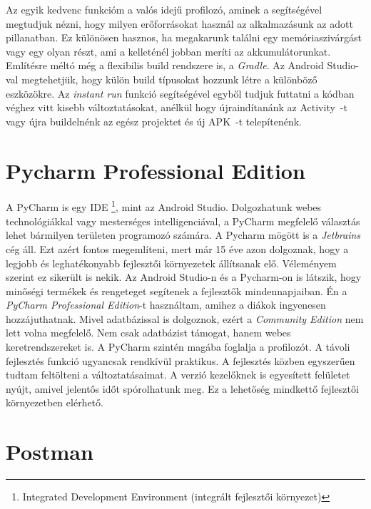 \documentclass{thesis-ekf}
\theoremstyle{definition}
\theoremstyle{remark}
\begin{document}
Az egyik kedvenc funkcióm a valós idejű profilozó, aminek a segítségével megtudjuk nézni, hogy milyen erőforrásokat használ az alkalmazásunk az adott pillanatban.
Ez különösen hasznos, ha megakarunk találni egy memóriaszivárgást vagy egy olyan részt, ami a kelleténél jobban meríti az akkumulátorunkat.
Említésre méltó még a flexibilis build rendszere is, a \emph{Gradle}. 
Az Android Studio-val megtehetjük, hogy külön build típusokat hozzunk létre a különböző eszközökre.
Az \emph{instant run} funkció segítségével egyből tudjuk futtatni a kódban véghez vitt kisebb változtatásokat, anélkül hogy újraindítanánk az Activity~-t vagy újra buildelnénk az egész projektet és új APK~-t telepítenénk.
\cite{androidstudio}

\section{Pycharm Professional Edition}

A PyCharm is egy IDE \footnote{Integrated Development Environment (integrált fejlesztői környezet)}, mint az Android Studio.
Dolgozhatunk webes technológiákkal vagy mesterséges intelligenciával, a PyCharm megfelelő választás lehet bármilyen területen programozó számára.
A Pycharm mögött is a \emph{Jetbrains} cég áll. Ezt azért fontos megemlíteni, mert már 15 éve azon dolgoznak, hogy a legjobb és leghatékonyabb fejlesztői környezetek állítsanak elő.
Véleményem szerint ez sikerült is nekik. Az Android Studio-n és a Pycharm-on  is látszik, hogy minőségi termékek és rengeteget segítenek a fejlesztők mindennapjaiban.
Én a \emph{PyCharm Professional Edition}-t használtam, amihez a diákok ingyenesen hozzájuthatnak.
Mivel adatbázissal is dolgoznok, ezért a \emph{Community Edition} nem lett volna megfelelő.
Nem csak adatbázist támogat, hanem webes keretrendszereket is.
A PyCharm szintén magába foglalja a profilozót.
A távoli fejlesztés funkció ugyancsak rendkívül praktikus.
A fejlesztés közben egyszerűen tudtam feltölteni a változtatásaimat.
A verzió kezelőknek is egyesített felületet nyújt, amivel jelentős időt spórolhatunk meg.\cite{pycharm}
Ez a lehetőség mindkettő fejlesztői környezetben elérhető.

\section{Postman}
\end{document}
